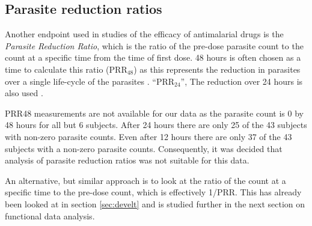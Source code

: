 



\subsection{Parasite reduction ratios}
Another endpoint used in studies of the efficacy of antimalarial drugs is the \emph{Parasite Reduction Ratio}, which is the ratio of the pre-dose parasite count to the count at a specific time from the time of first dose. 48 hours is often chosen as a time to calculate this ratio (PRR$_{48}$) as this represents the reduction in parasites over a single life-cycle of the parasites \cite{white}. ``PRR$_{24}$'', The reduction over 24 hours is also used \cite{newton}.

PRR48 measurements are not available for our data as the parasite count is 0 by 48 hours for all but 6 subjects. After 24 hours there are only 25 of the 43 subjects with non-zero parasite counts. Even after 12 hours there are only 37 of the 43 subjects with a non-zero parasite counts. Consequently, it was decided that analysis of parasite reduction ratios was not suitable for this data.

An alternative, but similar approach is to look at the ratio of the count at a specific time to the pre-dose count, which is effectively 1/PRR. This has already been looked at in section \ref{sec:develt} and is studied further in the next section on functional data analysis.

